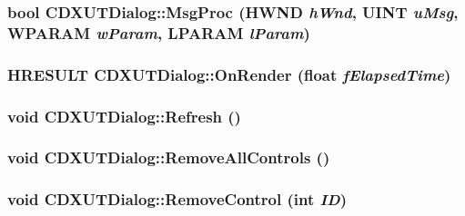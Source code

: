 \label{class_c_d_x_u_t_dialog_abfe2dae7b0eb882e25786ba20d52fc33}
\hypertarget{class_c_d_x_u_t_dialog_abb1e03c6d2da865384e34a6a60a41be4}{
\subsubsection[{MsgProc}]{\setlength{\rightskip}{0pt plus 5cm}bool CDXUTDialog::MsgProc (HWND {\em hWnd}, \/  UINT {\em uMsg}, \/  WPARAM {\em wParam}, \/  LPARAM {\em lParam})}}
\label{class_c_d_x_u_t_dialog_abb1e03c6d2da865384e34a6a60a41be4}
\hypertarget{class_c_d_x_u_t_dialog_acce59cefc90be252813be4c4e363fd03}{
\subsubsection[{OnRender}]{\setlength{\rightskip}{0pt plus 5cm}HRESULT CDXUTDialog::OnRender (float {\em fElapsedTime})}}
\label{class_c_d_x_u_t_dialog_acce59cefc90be252813be4c4e363fd03}
\hypertarget{class_c_d_x_u_t_dialog_a2fdbbfcd91be886b5843e790336b2f17}{
\subsubsection[{Refresh}]{\setlength{\rightskip}{0pt plus 5cm}void CDXUTDialog::Refresh ()}}
\label{class_c_d_x_u_t_dialog_a2fdbbfcd91be886b5843e790336b2f17}
\hypertarget{class_c_d_x_u_t_dialog_a175f6919678485e740d460add2e5544b}{
\subsubsection[{RemoveAllControls}]{\setlength{\rightskip}{0pt plus 5cm}void CDXUTDialog::RemoveAllControls ()}}
\label{class_c_d_x_u_t_dialog_a175f6919678485e740d460add2e5544b}
\hypertarget{class_c_d_x_u_t_dialog_ae30dd98c7baecd3d544ab15c17a32bd3}{
\subsubsection[{RemoveControl}]{\setlength{\rightskip}{0pt plus 5cm}void CDXUTDialog::RemoveControl ({\bf int} {\em ID})}}
